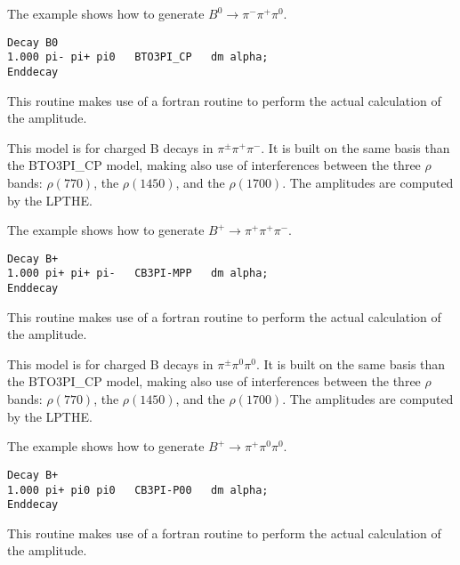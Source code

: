 \Example
\noindent The example shows how to generate $B^0 \rightarrow \pi^-\pi^+\pi^0$.
\begin{verbatim}
Decay B0
1.000 pi- pi+ pi0   BTO3PI_CP   dm alpha;
Enddecay
\end{verbatim}

\Notes
This routine makes use of a fortran routine to perform the 
actual calculation of the amplitude.



\label{cbto3pimpp}



\Expl
This model is for charged B decays in $\pi^{\pm}\pi^+\pi^-$.
It is built on the same basis than the BTO3PI\_CP model, making also use of interferences between the three $\rho$ bands: $\rho(770)$, the $\rho(1450)$, and the $\rho(1700)$. The amplitudes are computed by the LPTHE.

\Example

\noindent The example shows how to generate $B^+ \rightarrow \pi^+\pi^+\pi^-$.
\begin{verbatim}
Decay B+
1.000 pi+ pi+ pi-   CB3PI-MPP   dm alpha;
Enddecay
\end{verbatim}

\Notes
This routine makes use of a fortran routine to perform the 
actual calculation of the amplitude.



\label{cbto3pip00}



\Expl
This model is for charged B decays in $\pi^{\pm}\pi^0\pi^0$.
It is built on the same basis than the BTO3PI\_CP model, making also use of interferences between the three $\rho$ bands: $\rho(770)$, the $\rho(1450)$, and the $\rho(1700)$. The amplitudes are computed by the LPTHE.

\Example

\noindent The example shows how to generate $B^+ \rightarrow \pi^+\pi^0\pi^0$.
\begin{verbatim}
Decay B+
1.000 pi+ pi0 pi0   CB3PI-P00   dm alpha;
Enddecay
\end{verbatim}

\Notes
This routine makes use of a fortran routine to perform the 
actual calculation of the amplitude.


\label{btoKpipicp}

